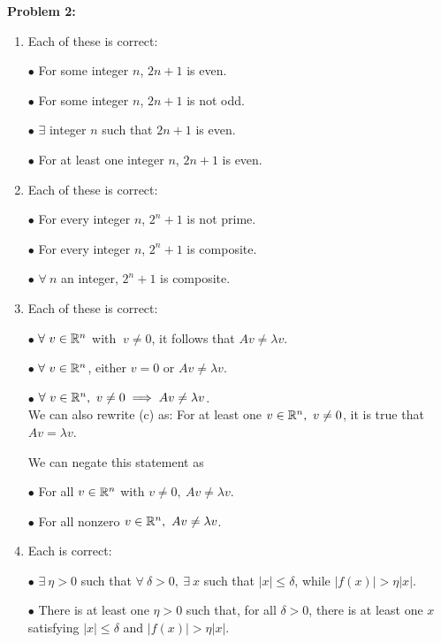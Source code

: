 \documentclass[letterpaper]{article}
\begin{document}
\noindent \textbf{Problem 2:}
\begin{enumerate}
\setlength{\itemsep}{.1in}
\renewcommand{\labelenumi}{(\alph{enumi})}
\item  Each of these is correct: \par
$\bullet$ For some integer $n$, $2n+1$ is even. \par
$\bullet$ For some integer $n$, $2n+1$ is not odd. \par
$\bullet$ $\exists$ integer $n$ such that $2n+1$ is even. \par
$\bullet$ For at least one integer $n$, $2n+1$ is even.

\item Each of these is correct: \par
$\bullet$ For every integer $n$, $2^{n}+1$ is not prime. \par
$\bullet$ For every integer $n$, $2^{n}+1$ is composite. \par
$\bullet$ $\forall~n$ an integer, $2^{n}+1$ is composite.

\item Each of these is correct: \par
$\bullet$ $\forall~v\in \mathbb R^n$ with $~ v\not= 0$, it follows that $Av\not=\lambda v$. \par
$\bullet$ $\forall~v\in \mathbb R^n$, either $v=0$ or $Av\not=\lambda v$. \par
$\bullet$ $\forall~v\in \mathbb R^n, ~ v\not= 0\implies Av\not=\lambda v$.
\medskip \\
We can also rewrite (c) as: For at least one $v\in \mathbb R^n, ~ v\not= 0$, it is true that $Av=\lambda v$.

We can negate this statement as \par
$\bullet$ For all $v\in \mathbb R^n$ with $v\not= 0,~Av\not=\lambda v$. \par
$\bullet$ For all nonzero $v\in \mathbb R^n,~Av\not=\lambda v$.

\item Each  is correct: \par
$\bullet$ $\exists~\eta>0$ such that $\forall~\delta>0, ~\exists~x$ such that $|x| \le \delta$, while $|f(x)|> \eta |x|$. \par
$\bullet$ There is at least one $\eta>0$ such that, for all $\delta>0$, there is at least one $x$ satisfying $|x| \le \delta$ and $|f(x)|> \eta |x|$.
\end{enumerate}
\end{document}
